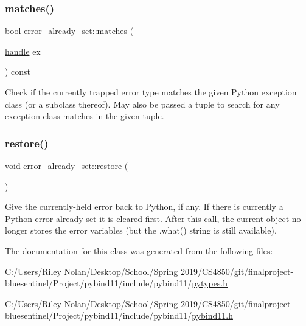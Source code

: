 \mbox{\label{classerror__already__set_af5fb36e2230179ee533617b55ee90ce2}} 
\subsubsection{\texorpdfstring{matches()}{matches()}}
{\footnotesize\ttfamily \mbox{\hyperlink{asdl_8h_af6a258d8f3ee5206d682d799316314b1}{bool}} error\+\_\+already\+\_\+set\+::matches (\begin{DoxyParamCaption}\item[{\mbox{\hyperlink{classhandle}{handle}}}]{ex }\end{DoxyParamCaption}) const\hspace{0.3cm}{\ttfamily [inline]}}

Check if the currently trapped error type matches the given Python exception class (or a subclass thereof). May also be passed a tuple to search for any exception class matches in the given tuple. \mbox{\label{classerror__already__set_a751b231e5c796447d867cf30007a7fc0}} 
\subsubsection{\texorpdfstring{restore()}{restore()}}
{\footnotesize\ttfamily \mbox{\hyperlink{_s_d_l__opengles2__gl2ext_8h_ae5d8fa23ad07c48bb609509eae494c95}{void}} error\+\_\+already\+\_\+set\+::restore (\begin{DoxyParamCaption}{ }\end{DoxyParamCaption})\hspace{0.3cm}{\ttfamily [inline]}}

Give the currently-\/held error back to Python, if any. If there is currently a Python error already set it is cleared first. After this call, the current object no longer stores the error variables (but the {\ttfamily .what()} string is still available). 

The documentation for this class was generated from the following files\+:\begin{DoxyCompactItemize}
\item 
C\+:/\+Users/\+Riley Nolan/\+Desktop/\+School/\+Spring 2019/\+C\+S4850/git/finalproject-\/bluesentinel/\+Project/pybind11/include/pybind11/\mbox{\hyperlink{pytypes_8h}{pytypes.\+h}}\item 
C\+:/\+Users/\+Riley Nolan/\+Desktop/\+School/\+Spring 2019/\+C\+S4850/git/finalproject-\/bluesentinel/\+Project/pybind11/include/pybind11/\mbox{\hyperlink{pybind11_8h}{pybind11.\+h}}\end{DoxyCompactItemize}
